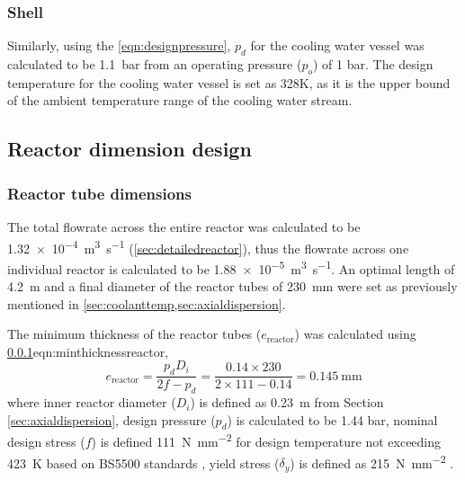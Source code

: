 \subsubsection{Shell}
Similarly, using the \cref{eqn:designpressure}, $p_d$ for the cooling water vessel was calculated to be \SI{1.1}{\bar} from an operating pressure ($p_o$) of 1 bar. The design temperature for the cooling water vessel is set as 328K, as it is the upper bound of the ambient temperature range of the cooling water stream. 

\subsection{Reactor dimension design}
\label{sec:reactordimensions}

\subsubsection{Reactor tube dimensions}
\label{sec:reactortube}
The total flowrate across the entire reactor was calculated to be \SI{1.32e-4}{\cubic\m\per\s} (\cref{sec:detailedreactor}), thus the flowrate across one individual reactor is calculated to be  \SI{1.88e-5}{\cubic\m\per\s}. An optimal length of \SI{4.2}{\metre} and a final diameter of the reactor tubes of \SI{230}{\milli \metre} were set as previously mentioned in \cref{sec:coolanttemp,sec:axialdispersion}. 

The minimum thickness of the reactor tubes ($e_\mathrm{reactor}$) was calculated using \cref{}{eqn:minthicknessreactor},
\begin{equation}
    e_\mathrm{reactor} = \frac{p_dD_i}{2f-p_d} = \frac{0.14 \times 230}{2 \times 111 - 0.14} = \SI{0.145}{\mm}
    \label{eqn:minthicknessreactor}
\end{equation}
where inner reactor diameter ($D_i$) is defined as \SI{0.23}{\metre} from Section \ref{sec:axialdispersion}, design pressure ($p_d$) is calculated to be 1.44 bar, nominal design stress ($f$) is defined \SI{111}{\N\per\square\mm} for design temperature not exceeding \SI{423}{\K} based on BS5500 standards , yield stress ($\delta_y$) is defined as \SI{215}{\N\per\square\mm} \cite{noauthor_unfired_nodate}.



